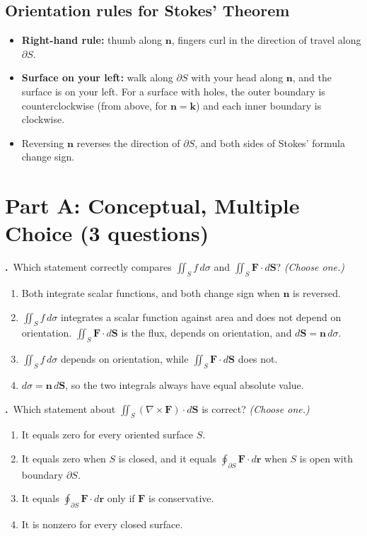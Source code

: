 \documentclass[11pt]{article}
\newcommand{\bF}{\mathbf{F}}
\newcommand{\br}{\mathbf{r}}
\newcommand{\bn}{\mathbf{n}}
\newcommand{\bk}{\mathbf{k}}
\newcommand{\curl}{\nabla\times}
\newcounter{qn}
\newcommand{\Q}{\par\vspace{6pt}\stepcounter{qn}\textbf{\theqn.}\ }
\begin{document}
\subsection*{Orientation rules for Stokes' Theorem}
\begin{itemize}[nosep]
  \item \textbf{Right-hand rule:} thumb along $\bn$, fingers curl in the direction of travel along $\partial S$.
  \item \textbf{Surface on your left:} walk along $\partial S$ with your head along $\bn$, and the surface is on your left. For a surface with holes, the outer boundary is counterclockwise (from above, for $\bn=\bk$) and each inner boundary is clockwise.
  \item Reversing $\bn$ reverses the direction of $\partial S$, and both sides of Stokes' formula change sign.
\end{itemize}

\section*{Part A: Conceptual, Multiple Choice (3 questions)}

\Q Which statement correctly compares $\iint_S f\,d\sigma$ and $\iint_S\bF\cdot d\mathbf{S}$? \emph{(Choose one.)}
\begin{enumerate}[label=(\Alph*),nosep]
  \item Both integrate scalar functions, and both change sign when $\bn$ is reversed.
  \item $\iint_S f\,d\sigma$ integrates a scalar function against area and does not depend on orientation. $\iint_S\bF\cdot d\mathbf{S}$ is the flux, depends on orientation, and $d\mathbf{S}=\bn\,d\sigma$.
  \item $\iint_S f\,d\sigma$ depends on orientation, while $\iint_S\bF\cdot d\mathbf{S}$ does not.
  \item $d\sigma=\bn\,d\mathbf{S}$, so the two integrals always have equal absolute value.
\end{enumerate}

\Q Which statement about $\iint_S(\curl\bF)\cdot d\mathbf{S}$ is correct? \emph{(Choose one.)}
\begin{enumerate}[label=(\Alph*),nosep]
  \item It equals zero for every oriented surface $S$.
  \item It equals zero when $S$ is closed, and it equals $\oint_{\partial S}\bF\cdot d\br$ when $S$ is open with boundary $\partial S$.
  \item It equals $\oint_{\partial S}\bF\cdot d\br$ only if $\bF$ is conservative.
  \item It is nonzero for every closed surface.
\end{enumerate}
\end{document}
